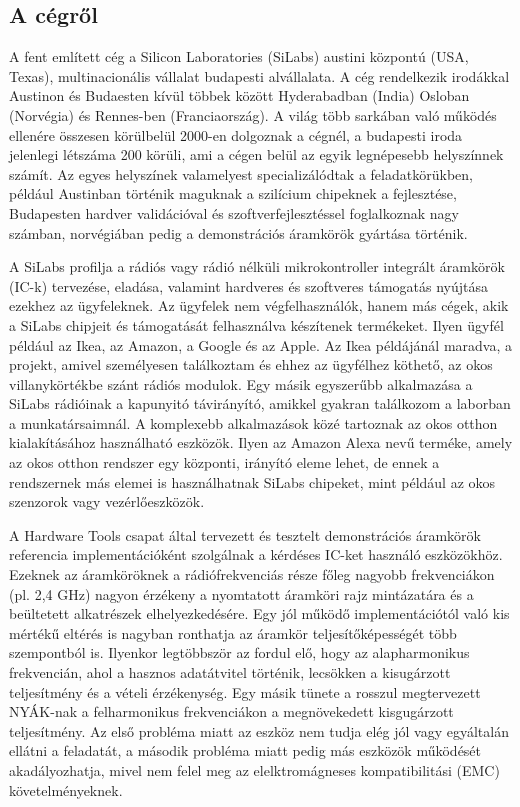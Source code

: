\documentclass[a4paper,12pt,titlepage]{article}
\begin{document}
    \subsection{A cégről}
        A fent említett cég a Silicon Laboratories (SiLabs) austini központú (USA, Texas), multinacionális vállalat budapesti alvállalata. A cég rendelkezik irodákkal Austinon és Budaesten kívül többek között Hyderabadban (India) Osloban (Norvégia) és Rennes-ben (Franciaország). A világ több sarkában való működés ellenére összesen körülbelül 2000-en dolgoznak a cégnél, a budapesti iroda jelenlegi létszáma 200 körüli, ami a cégen belül az egyik legnépesebb helyszínnek számít. Az egyes helyszínek valamelyest specializálódtak a feladatkörükben, például Austinban történik maguknak a szilícium chipeknek a fejlesztése, Budapesten hardver validációval és szoftverfejlesztéssel foglalkoznak nagy számban, norvégiában pedig a demonstrációs áramkörök gyártása történik.
        \par
        A SiLabs profilja a rádiós vagy rádió nélküli mikrokontroller integrált áramkörök (IC-k) tervezése, eladása, valamint hardveres és szoftveres támogatás nyújtása ezekhez az ügyfeleknek. Az ügyfelek nem végfelhasználók, hanem más cégek, akik a SiLabs chipjeit és támogatását felhasználva készítenek termékeket. Ilyen ügyfél például az Ikea, az Amazon, a Google és az Apple. Az Ikea példájánál maradva, a projekt, amivel személyesen találkoztam és ehhez az ügyfélhez köthető, az okos villanykörtékbe szánt rádiós modulok. Egy másik egyszerűbb alkalmazása a SiLabs rádióinak a kapunyitó távirányító, amikkel gyakran találkozom a laborban a munkatársaimnál. A komplexebb alkalmazások közé tartoznak az okos otthon kialakításához használható eszközök. Ilyen az Amazon Alexa nevű terméke, amely az okos otthon rendszer egy központi, irányító eleme lehet, de ennek a rendszernek más elemei is használhatnak SiLabs chipeket, mint például az okos szenzorok vagy vezérlőeszközök.
        \par
        A Hardware Tools csapat által tervezett és tesztelt demonstrációs áramkörök referencia implementációként szolgálnak a kérdéses IC-ket használó eszközökhöz. Ezeknek az áramköröknek a rádiófrekvenciás része főleg nagyobb frekvenciákon (pl. 2,4 GHz) nagyon érzékeny a nyomtatott áramköri rajz mintázatára és a beültetett alkatrészek elhelyezkedésére. Egy jól működő implementációtól való kis mértékű eltérés is nagyban ronthatja az áramkör teljesítőképességét több szempontból is. Ilyenkor legtöbbször az fordul elő, hogy az alapharmonikus frekvencián, ahol a hasznos adatátvitel történik, lecsökken a kisugárzott teljesítmény és a vételi érzékenység. Egy másik tünete a rosszul megtervezett NYÁK-nak a felharmonikus frekvenciákon a megnövekedett kisgugárzott teljesítmény. Az első probléma miatt az eszköz nem tudja elég jól vagy egyáltalán ellátni a feladatát, a második probléma miatt pedig más eszközök működését akadályozhatja, mivel nem felel meg az elelktromágneses kompatibilitási (EMC) követelményeknek.
\end{document}
